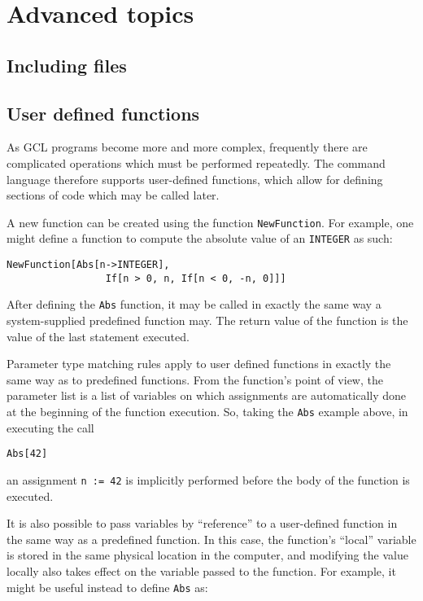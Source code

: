 \section{Advanced topics}

\subsection{Including files}

\subsection{User defined functions}

As GCL programs become more and more complex, frequently there are complicated
operations which must be performed repeatedly.  The command language therefore
supports user-defined functions, which allow for defining sections of code
which may be called later.

A new function can be created using the function
\verb+NewFunction+.  For example, one might define a function to compute
the absolute value of an {\tt INTEGER} as such:

\begin{verbatim}
NewFunction[Abs[n->INTEGER],
                 If[n > 0, n, If[n < 0, -n, 0]]]
\end{verbatim}

\noindent After defining the \verb+Abs+ function, it may be called in exactly
the same way a system-supplied predefined function may.  The return value
of the function is the value of the last statement executed. 

Parameter type matching rules apply to user defined functions in exactly the
same way as to predefined functions.  From the function's point of view,
the parameter list is a list of variables on which assignments are
automatically done at the beginning of the function execution.  So, taking
the \verb+Abs+ example above, in executing the call

\begin{verbatim}
Abs[42]
\end{verbatim}

\noindent an assignment \verb+n := 42+ is implicitly performed before the
body of the function is executed.

It is also possible to pass variables by ``reference'' to a user-defined
function in the same way as a predefined function.  In this case, the
function's ``local'' variable is stored in the same physical location in the
computer, and modifying the value locally also takes effect on the variable
passed to the function.  For example, it might
be useful instead to define \verb+Abs+ as:

